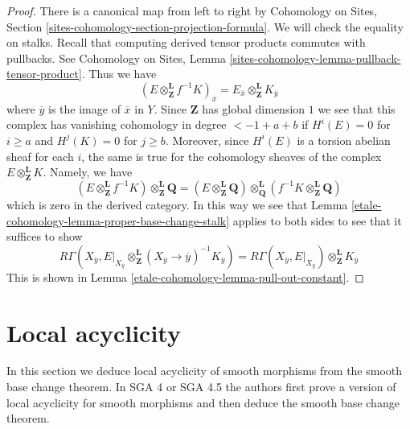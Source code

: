 \begin{proof}
There is a canonical map from left to right by
Cohomology on Sites, Section \ref{sites-cohomology-section-projection-formula}.
We will check the equality on stalks.
Recall that computing derived tensor products commutes with pullbacks.
See Cohomology on Sites, Lemma
\ref{sites-cohomology-lemma-pullback-tensor-product}.
Thus we have
$$
(E \otimes_\mathbf{Z}^\mathbf{L} f^{-1}K)_{\overline{x}}
=
E_{\overline{x}} \otimes_\mathbf{Z}^\mathbf{L} K_{\overline{y}}
$$
where $\overline{y}$ is the image of $\overline{x}$ in $Y$.
Since $\mathbf{Z}$ has global dimension $1$ we see that
this complex has vanishing cohomology in degree $< - 1 + a + b$
if $H^i(E) = 0$ for $i \geq a$ and $H^j(K) = 0$ for $j \geq b$.
Moreover, since $H^i(E)$ is a torsion abelian
sheaf for each $i$, the same is true for the cohomology
sheaves of the complex $E \otimes_\mathbf{Z}^\mathbf{L} K$.
Namely, we have
$$
(E \otimes_\mathbf{Z}^\mathbf{L} f^{-1}K)
\otimes_{\mathbf{Z}}^\mathbf{L} \mathbf{Q} =
(E \otimes_\mathbf{Z}^\mathbf{L} \mathbf{Q})
\otimes_{\mathbf{Q}}^\mathbf{L}
(f^{-1}K \otimes_{\mathbf{Z}}^\mathbf{L} \mathbf{Q})
$$
which is zero in the derived category.
In this way we see that Lemma \ref{etale-cohomology-lemma-proper-base-change-stalk}
applies to both sides to see that it suffices to show
$$
R\Gamma(X_{\overline{y}},
E|_{X_{\overline{y}}} \otimes_\mathbf{Z}^\mathbf{L}
(X_{\overline{y}} \to \overline{y})^{-1}K_{\overline{y}}) =
R\Gamma(X_{\overline{y}},
E|_{X_{\overline{y}}}) \otimes_\mathbf{Z}^\mathbf{L} K_{\overline{y}}
$$
This is shown in Lemma \ref{etale-cohomology-lemma-pull-out-constant}.
\end{proof}

\section{Local acyclicity}
\label{etale-cohomology-section-local-acyclicity}
In this section we deduce local acyclicity of smooth morphisms
from the smooth base change theorem. In SGA 4 or SGA 4.5 the authors
first prove a version of local acyclicity for smooth morphisms
and then deduce the smooth base change theorem.

